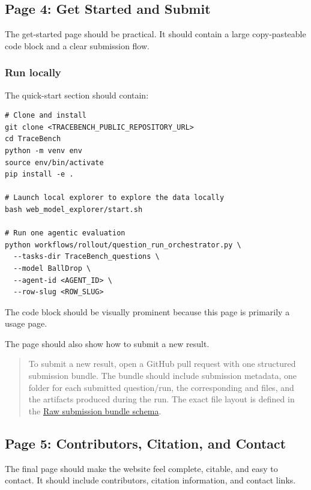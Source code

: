 \documentclass[11pt]{article}
\begin{document}
\label{sec:website-page-get-started}
\subsection*{Page 4: Get Started and Submit}

The get-started page should be practical.
It should contain a large copy-pasteable code block and a clear submission flow.

\subsubsection*{Run locally}

The quick-start section should contain:

\begin{verbatim}
# Clone and install
git clone <TRACEBENCH_PUBLIC_REPOSITORY_URL>
cd TraceBench
python -m venv env
source env/bin/activate
pip install -e .

# Launch local explorer to explore the data locally
bash web_model_explorer/start.sh

# Run one agentic evaluation
python workflows/rollout/question_run_orchestrator.py \
  --tasks-dir TraceBench_questions \
  --model BallDrop \
  --agent-id <AGENT_ID> \
  --row-slug <ROW_SLUG>
\end{verbatim}

The code block should be visually prominent because this page is primarily a usage page.

The page should also show how to submit a new result.

\begin{quote}
To submit a new result, open a GitHub pull request with one structured submission bundle.
The bundle should include submission metadata, one folder for each submitted question/run, the corresponding  and  files, and the artifacts produced during the run.
The exact file layout is defined in the \hyperref[sec:website-raw-submission-bundle]{Raw submission bundle schema}.
\end{quote}


\phantomsection\label{sec:website-page-contributors}
\subsection*{Page 5: Contributors, Citation, and Contact}

The final page should make the website feel complete, citable, and easy to contact.
It should include contributors, citation information, and contact links.
\end{document}
